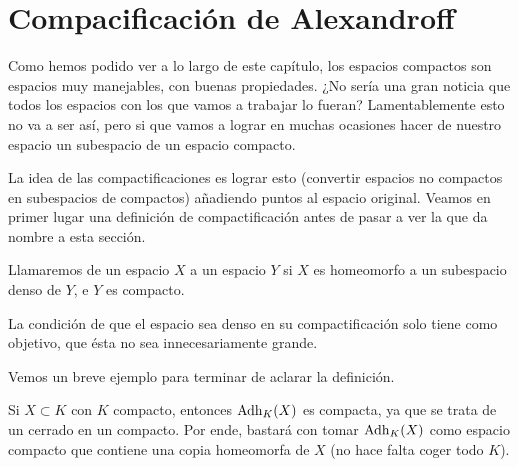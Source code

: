 \section{Compacificación de Alexandroff}

Como hemos podido ver a lo largo de este capítulo, los espacios compactos son espacios muy manejables, con buenas propiedades. ¿No sería una gran noticia que todos los espacios con los que vamos a trabajar lo fueran? Lamentablemente esto no va a ser así, pero si que vamos a lograr en muchas ocasiones hacer de nuestro espacio un subespacio de un espacio compacto.


La idea de las compactificaciones es lograr esto (convertir espacios no compactos en subespacios de compactos) añadiendo puntos al espacio original.
Veamos en primer lugar una definición de compactificación antes de pasar a ver la que da nombre a esta sección.

\begin{defi}[Compactificación]
	Llamaremos  de un espacio $X$ a un espacio $Y$ si $X$ es homeomorfo a un subespacio denso de $Y$, e $Y$ es compacto.
\end{defi}


La condición de que el espacio sea denso en su compactificación solo tiene como objetivo, que ésta no sea innecesariamente grande. 


Vemos un breve ejemplo para terminar de aclarar la definición.
\begin{exa}
	Si $X\subset K$ con $K$ compacto, entonces $\operatorname{\mathrm{Adh}}_K(X)$ es compacta, ya que se trata de un cerrado en un compacto. Por ende, bastará con tomar $\operatorname{\mathrm{Adh}}_K(X)$ como espacio compacto que contiene una copia homeomorfa de $X$ (no hace falta coger todo $K$).
\end{exa}

